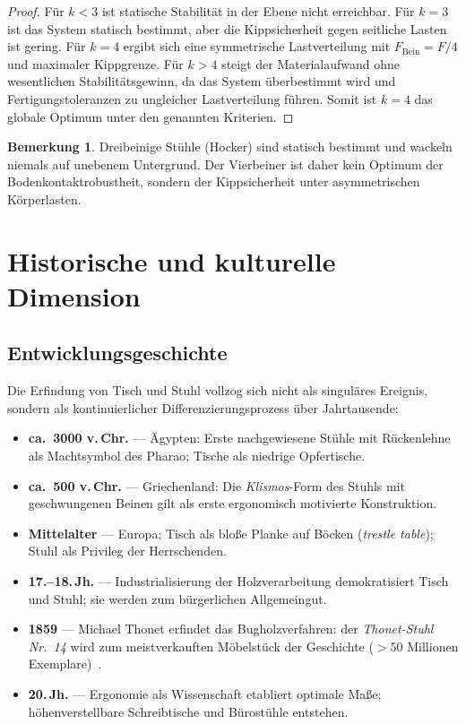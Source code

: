 \documentclass[a4paper,12pt]{article}
\theoremstyle{definition}
\newtheorem{bemerkung}{Bemerkung}
\begin{document}
\begin{proof}
	F\"{u}r $k < 3$ ist statische Stabilit\"{a}t in der Ebene nicht erreichbar. F\"{u}r $k = 3$
	ist das System statisch bestimmt, aber die Kippsicherheit gegen seitliche Lasten ist
	gering. F\"{u}r $k = 4$ ergibt sich eine symmetrische Lastverteilung mit
	$F_{\mathrm{Bein}} = F/4$ und maximaler Kippgrenze. F\"{u}r $k > 4$ steigt der
	Materialaufwand ohne wesentlichen Stabilit\"{a}tsgewinn, da das System \"{u}berbestimmt wird
	und Fertigungstoleranzen zu ungleicher Lastverteilung f\"{u}hren. Somit ist $k = 4$ das
	globale Optimum unter den genannten Kriterien.
\end{proof}

\begin{bemerkung}
	Dreibeinige St\"{u}hle (Hocker) sind statisch bestimmt und wackeln niemals auf unebenem
	Untergrund. Der Vierbeiner ist daher kein Optimum der Bodenkontaktrobustheit, sondern
	der Kippsicherheit unter asymmetrischen K\"{o}rperlasten.
\end{bemerkung}

\section{Historische und kulturelle Dimension}

\subsection{Entwicklungsgeschichte}

Die Erfindung von Tisch und Stuhl vollzog sich nicht als singul\"{a}res Ereignis, sondern
als kontinuierlicher Differenzierungsprozess \"{u}ber Jahrtausende:
\begin{itemize}
	\item \textbf{ca.\ 3000 v.\,Chr.} --- \"{A}gypten: Erste nachgewiesene St\"{u}hle mit
	      R\"{u}ckenlehne als Machtsymbol des Pharao; Tische als niedrige Opfertische.
	\item \textbf{ca.\ 500 v.\,Chr.} --- Griechenland: Die \emph{Klismos}-Form des Stuhls
	      mit geschwungenen Beinen gilt als erste ergonomisch motivierte Konstruktion.
	\item \textbf{Mittelalter} --- Europa: Tisch als blo\ss{}e Planke auf B\"{o}cken
	      (\emph{trestle table}); Stuhl als Privileg der Herrschenden.
	\item \textbf{17.--18.\,Jh.} --- Industrialisierung der Holzverarbeitung demokratisiert
	      Tisch und Stuhl; sie werden zum b\"{u}rgerlichen Allgemeingut.
	\item \textbf{1859} --- Michael Thonet erfindet das Bugholzverfahren: der
	      \emph{Thonet-Stuhl Nr.~14} wird zum meistverkauften M\"{o}belst\"{u}ck der Geschichte
	      ($> 50$ Millionen Exemplare)~\cite{VegesackThonet1996}.
	\item \textbf{20.\,Jh.} --- Ergonomie als Wissenschaft etabliert optimale Ma\ss{}e;
	      h\"{o}henverstellbare Schreibtische und B\"{u}rost\"{u}hle entstehen.
\end{itemize}
\end{document}
